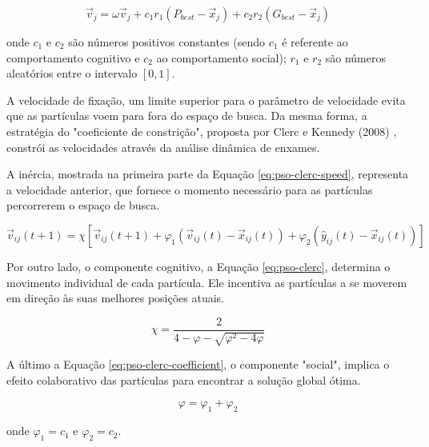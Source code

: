 \begin{equation} \label{eq:pso-speed}
    \vec{v}_j = \omega \vec{v}_j + c_1 r_1(P_{best} - \vec{x}_j) + c_2 r_2(G_{best} - \vec{x}_j)
\end{equation} 

onde $c_1$ e $c_2$ são números positivos constantes (sendo $c_1$ é referente ao comportamento cognitivo e $c_2$ ao comportamento social); $r_1$ e $r_2$ são números aleatórios entre o intervalo $[0,1]$.

A velocidade de fixação, um limite superior para o parâmetro de velocidade evita que as partículas voem para fora do espaço de busca. Da mesma forma, a estratégia do "coeficiente de constrição", proposta por Clerc e Kennedy (2008) \cite{clerc2002particle}, constrói as velocidades através da análise dinâmica de enxames.

A inércia, mostrada na primeira parte da Equação \ref{eq:pso-clerc-speed}, representa a velocidade anterior, que fornece o momento necessário para as partículas percorrerem o espaço de busca.

\begin{equation} \label{eq:pso-clerc-speed}
    \vec{v}_{ij}(t+1) = \chi[\vec{v}_{ij}(t+1) + \varphi_1(\vec{v}_{ij}(t) - \vec{x}_{ij}(t)) + \varphi_2(\hat{y}_{ij}(t) - \vec{x}_{ij}(t))]
\end{equation}

Por outro lado, o componente cognitivo, a Equação \ref{eq:pso-clerc}, determina o movimento individual de cada partícula. Ele incentiva as partículas a se moverem em direção às suas melhores posições atuais. 

\begin{equation} \label{eq:pso-clerc}
    \chi = \frac{2}{4 - \varphi - \sqrt{\varphi^2 - 4\varphi}}
\end{equation}

A último a Equação \ref{eq:pso-clerc-coefficient}, o componente "social", implica o efeito colaborativo das partículas para encontrar a solução global ótima.

\begin{equation} \label{eq:pso-clerc-coefficient}
    \varphi = \varphi_1 + \varphi_2
\end{equation}

onde $ \varphi_1 = c_1$ e $ \varphi_2 = c_2$.


